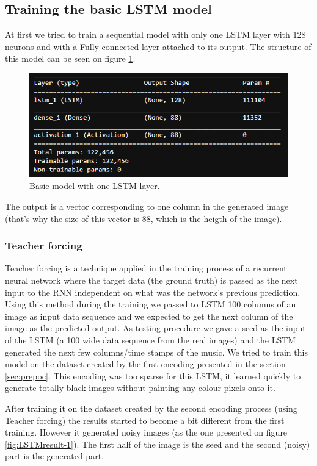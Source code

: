 \documentclass{article}
\begin{document}
\subsection{Training the basic LSTM model}

At first we tried to train a sequential model with only one LSTM layer with 128 neurons and with a Fully connected layer attached to its output. The structure of this model can be seen on figure \ref{fig:basicLSTMmodel}. 
\begin{figure}[!htb]
	\centering
	\includegraphics[width=0.8\linewidth]{basicLSTMmodel.png}
	\caption{Basic model with one LSTM layer.}
	\label{fig:basicLSTMmodel}
\end{figure}

The output is a vector corresponding to one column in the generated image (that's why the size of this vector is 88, which is the heigth of the image). 

\subsubsection{Teacher forcing}
Teacher forcing is a technique applied in the training process of a recurrent neural network where the target data (the ground truth) is passed as the next input to the RNN independent on what was the network's previous prediction. 
Using this method during the training we passed to LSTM 100 columns of an image as input data sequence and we expected to get the next column of the image as the predicted output. 
As testing procedure we gave a seed as the input of the LSTM (a 100 wide data sequence from the real images) and the LSTM generated the next few columns/time stamps of the music.
We tried to train this model on the dataset created by the first encoding presented in the section \ref{sec:prepoc}. This encoding was too sparse for this LSTM, it learned quickly to generate totally black images without painting any colour pixels onto it. 

After training it on the dataset created by the second encoding process (using Teacher forcing) the results started to become a bit different from the first training. However it generated noisy images (as the one presented on figure \ref{fig:LSTMresult-1}). The first half of the image is the seed and the second (noisy) part is the generated part. 
\end{document}
